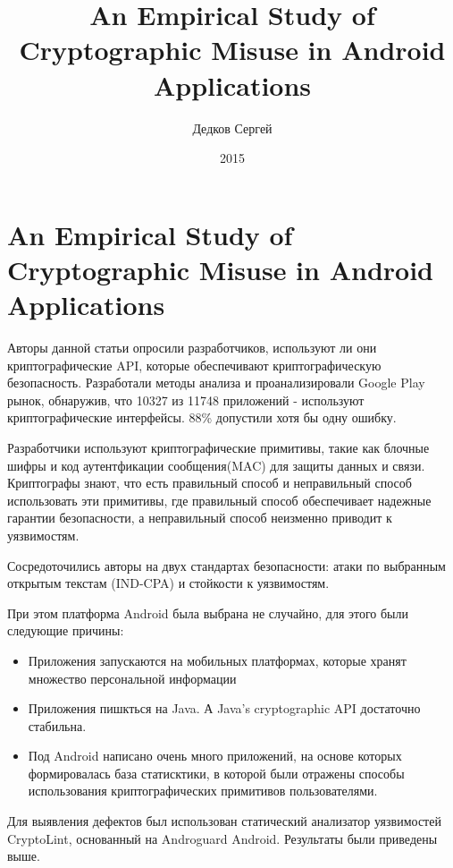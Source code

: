 \documentclass[11pt, a4paper]{article}		%
\author{Дедков Сергей}
\title{An Empirical Study of Cryptographic Misuse in Android Applications}
\date{2015}
\begin{document}
\maketitle

\section{An Empirical Study of Cryptographic Misuse in Android Applications}

Авторы данной статьи опросили разработчиков, используют ли они криптографические API, которые обеспечивают криптографическую безопасность.
Разработали методы анализа и проанализировали Google Play рынок, обнаружив, что 10327 из 11748 приложений - используют криптографические интерфейсы. 88\% допустили хотя бы одну ошибку.

Разработчики используют криптографические примитивы, такие как блочные шифры и код аутентфикации сообщения(MAC) для защиты данных и связи. Криптографы знают, что есть правильный способ и неправильный способ использовать эти примитивы, где правильный способ обеспечивает надежные гарантии безопасности, а неправильный способ неизменно приводит к уязвимостям.

Сосредоточились авторы на двух стандартах безопасности: атаки по выбранным открытым текстам (IND-CPA) и стойкости к уязвимостям.

При этом платформа Android была выбрана не случайно, для этого были следующие причины:

\begin{itemize}

\item Приложения запускаются на мобильных платформах, которые хранят множество персональной информации

\item Приложения пишкться на Java. А Java’s cryptographic API достаточно стабильна.

\item Под Android написано очень много приложений, на основе которых формировалась база статисктики, в которой были отражены способы использования криптографических примитивов пользователями.

\end{itemize}

Для выявления дефектов был использован статический анализатор уязвимостей CryptoLint, основанный на Androguard Android. Результаты были приведены выше.
\end{document}
